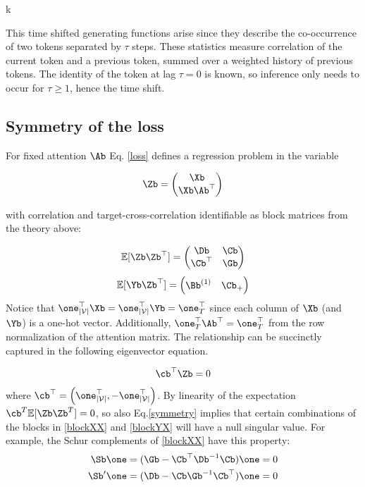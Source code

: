 k\documentclass{article}
\begin{document}
This time shifted generating functions arise since they describe the co-occurrence of two tokens separated by $\tau$ steps. These statistics measure  correlation of the current token and a previous token, summed over a weighted history of previous tokens. The identity of the token at lag $\tau=0$ is known, so inference only needs to occur for $\tau\ge1$, hence the time shift. 

\subsection{Symmetry of the loss}
For fixed attention $\Ab$ Eq. \eqref{loss} defines a regression problem in the variable

\begin{equation}
    \Zb = 
    \begin{pmatrix}
        \Xb \\
        \Xb\Ab^\top
    \end{pmatrix}
\end{equation}

with correlation and target-cross-correlation identifiable as block matrices from the theory above:

\begin{equation}\label{blockXX}
\mathbb{E}[\Zb\Zb^\top] = 
    \begin{pmatrix}
        \Db & \Cb \\
        \Cb^\top & \Gb
    \end{pmatrix}  
\end{equation}
\begin{equation}\label{blockYX}
\mathbb{E}[\Yb\Zb^\top] = 
    \begin{pmatrix}
        \Bb^{(1)} & \Cb_+
    \end{pmatrix}  
\end{equation}
Notice that $\one^\top_{\vert\mathcal{V}\vert} \Xb = \one^\top_{\vert\mathcal{V}\vert} \Yb= \one^\top_T$ since each column of $\Xb$ (and $\Yb$) is a one-hot vector. Additionally, $\one^\top_T \Ab^\top = \one^\top_T$ from the row normalization of the attention matrix. The relationship can be succinctly captured in the following eigenvector equation. 

\begin{equation}\label{symmetry}
    \cb^\top \Zb = 0
\end{equation}
where $\cb^\top = \left(\one^\top_{\vert\mathcal{V}\vert}, -\one^\top_{\vert\mathcal{V}\vert}\right)$. By linearity of the expectation $\cb^T \mathbb{E}[\Zb\Zb^T] = 0$, so also Eq.\ref{symmetry} implies that certain combinations of the blocks in \eqref{blockXX} and \eqref{blockYX} will have a null singular value. For example, the Schur complements of \eqref{blockXX} have this property:
\begin{align}
    \Sb\one &= (\Gb - \Cb^\top \Db^{-1}\Cb)\one = 0 \label{snull}\\
    \Sb'\one &= (\Db - \Cb \Gb^{-1}\Cb^\top)\one = 0
\end{align}
\end{document}
